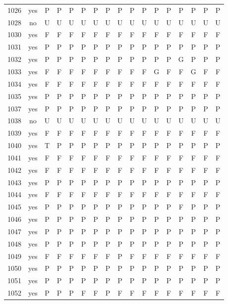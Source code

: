 \begin{table}[p]
\begin{tabular*}{\textwidth}{@{\extracolsep{\fill}}rcccccccccccccccc}
1026 & yes & P & P & P & P & P & P & P & P & P & P & P & P & P & P & P\\
1028 & no & U & U & U & U & U & U & U & U & U & U & U & U & U & U & U\\
1030 & yes & F & F & F & F & F & F & F & F & F & F & F & F & F & F & F\\
1031 & yes & P & P & P & P & P & P & P & P & P & P & P & P & P & P & P\\
1032 & yes & P & P & P & P & P & P & P & P & P & P & P & G & P & P & P\\
1033 & yes & F & F & F & F & F & F & F & F & F & G & F & F & G & F & F\\
1034 & yes & F & F & F & F & F & F & F & F & F & F & F & F & F & F & F\\
1035 & yes & P & P & P & P & P & P & P & P & P & P & P & P & P & P & P\\
1037 & yes & P & P & P & P & P & P & P & P & P & P & P & P & P & P & P\\
1038 & no & U & U & U & U & U & U & U & U & U & U & U & U & U & U & U\\
1039 & yes & F & F & F & F & F & F & F & F & F & F & F & F & F & F & F\\
1040 & yes & T & P & P & P & P & P & P & P & P & P & P & P & P & P & P\\
1041 & yes & F & F & F & F & F & F & F & F & F & F & F & F & F & F & F\\
1042 & yes & F & F & F & F & F & F & F & F & F & F & F & F & F & F & F\\
1043 & yes & P & P & P & P & P & P & P & P & P & P & P & P & P & P & P\\
1044 & yes & F & F & F & F & F & F & F & F & F & F & F & F & F & F & F\\
1045 & yes & P & P & P & P & P & P & P & P & P & P & P & F & P & P & P\\
1046 & yes & P & P & P & P & P & P & P & P & P & P & P & P & P & P & P\\
1047 & yes & P & P & P & P & P & P & P & P & P & P & P & P & P & P & P\\
1048 & yes & P & P & P & P & P & P & P & P & P & P & P & P & P & P & P\\
1049 & yes & F & F & F & F & F & F & P & F & F & F & F & F & F & F & F\\
1050 & yes & P & P & P & P & P & P & P & P & P & P & P & P & P & P & P\\
1051 & yes & P & P & P & P & P & P & P & P & P & P & P & P & P & P & P\\
1052 & yes & P & P & P & F & F & P & F & F & F & F & F & F & F & F & F\\
\bottomrule\end{tabular*}\end{table}
\clearpage

